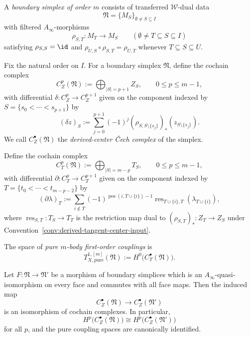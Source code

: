 \begin{definition}
A \emph{boundary simplex of order $m$} consists of transferred $\mathcal W$-dual data
\[
\mathfrak N=\{M_S\}_{\emptyset\neq S\subseteq I}
\]
with filtered $A_\infty$-morphisms
\[
\rho_{S,T}\colon M_T\longrightarrow M_S
\qquad (\emptyset\neq T\subseteq S\subseteq I)
\]
satisfying $\rho_{S,S}=\id$ and $\rho_{U,S}\circ \rho_{S,T}=\rho_{U,T}$ whenever
$T\subseteq S\subseteq U$.
\end{definition}

\begin{definition}
Fix the natural order on $I$. For a boundary simplex $\mathfrak N$, define the cochain complex
\[
C_Z^p(\mathfrak N):=\bigoplus_{|S|=p+1} Z_S,
\qquad 0\le p\le m-1,
\]
with differential $\delta\colon C_Z^p\to C_Z^{p+1}$ given on the component indexed by
$S=\{s_0<\cdots<s_{p+1}\}$ by
\[
(\delta z)_S
:=
\sum_{j=0}^{p+1}(-1)^j (\rho_{S,S\setminus\{s_j\}})_*(z_{S\setminus\{s_j\}}).
\]
We call $C_Z^\bullet(\mathfrak N)$ the \emph{derived-center \v{C}ech complex} of the simplex.
\end{definition}

\begin{definition}
Define the cochain complex
\[
C_T^p(\mathfrak N):=\bigoplus_{|S|=m-p} T_S,
\qquad 0\le p\le m-1,
\]
with differential $\partial\colon C_T^p\to C_T^{p+1}$ given on the component indexed by
$T=\{t_0<\cdots<t_{m-p-2}\}$ by
\[
(\partial\lambda)_T
:=
\sum_{i\notin T}(-1)^{\operatorname{pos}(i,T\cup\{i\})-1}
\operatorname{res}_{T\cup\{i\},T}(\lambda_{T\cup\{i\}}),
\]
where $\operatorname{res}_{S,T}\colon T_S\to T_T$ is the restriction map dual to
$(\rho_{S,T})_*\colon Z_T\to Z_S$ under Convention~\ref{conv:derived-tangent-center-input}.

The space of \emph{pure $m$-body first-order couplings} is
\[
T^{1,[m]}_{X,\mathrm{pure}}(\mathfrak N):=H^0\bigl(C_T^\bullet(\mathfrak N)\bigr).
\]
\end{definition}

\begin{lemma}
Let $F\colon \mathfrak N\to \mathfrak N'$ be a morphism of boundary simplices which is an
$A_\infty$-quasi-isomorphism on every face and commutes with all face maps. Then the induced map
\[
C_Z^\bullet(\mathfrak N)\longrightarrow C_Z^\bullet(\mathfrak N')
\]
is an isomorphism of cochain complexes. In particular,
\[
H^p\bigl(C_Z^\bullet(\mathfrak N)\bigr)
\cong
H^p\bigl(C_Z^\bullet(\mathfrak N')\bigr)
\]
for all $p$, and the pure coupling spaces are canonically identified.
\end{lemma}

